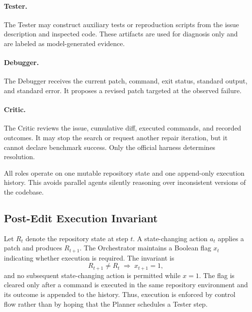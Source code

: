 \documentclass[journal]{IEEEtran}
\begin{document}
\paragraph{Tester.} The Tester may construct auxiliary tests or reproduction scripts from the issue description and inspected code. These artifacts are used for diagnosis only and are labeled as model-generated evidence.

\paragraph{Debugger.} The Debugger receives the current patch, command, exit status, standard output, and standard error. It proposes a revised patch targeted at the observed failure.

\paragraph{Critic.} The Critic reviews the issue, cumulative diff, executed commands, and recorded outcomes. It may stop the search or request another repair iteration, but it cannot declare benchmark success. Only the official harness determines resolution.

All roles operate on one mutable repository state and one append-only execution history. This avoids parallel agents silently reasoning over inconsistent versions of the codebase.

\subsection{Post-Edit Execution Invariant}
\label{sec:invariant}

Let $R_t$ denote the repository state at step $t$. A state-changing action $a_t$ applies a patch and produces $R_{t+1}$. The Orchestrator maintains a Boolean flag $x_t$ indicating whether execution is required. The invariant is
\begin{equation}
  R_{t+1} \neq R_t \;\Rightarrow\; x_{t+1}=1,
\end{equation}
and no subsequent state-changing action is permitted while $x=1$. The flag is cleared only after a command is executed in the same repository environment and its outcome is appended to the history. Thus, execution is enforced by control flow rather than by hoping that the Planner schedules a Tester step.
\end{document}
